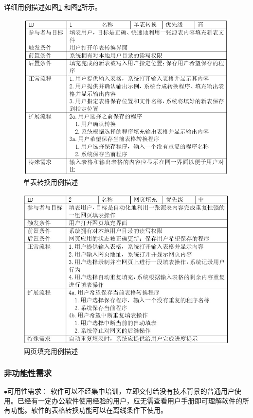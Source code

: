 \documentclass[design, pageheader]{njubachelor}
\begin{document}
详细用例描述如图\ref{fig:use_case_1} 和图\ref{fig:use_case_2}所示。

\begin{figure}
    \includegraphics{figures/use_case1.jpg}
    \caption{单表转换用例描述}
    \label{fig:use_case_1}
\end{figure}

\begin{figure}
    \includegraphics{figures/use_case2.jpg}
    \caption{网页填充用例描述}
    \label{fig:use_case_2}
\end{figure}

\subsubsection{非功能性需求}
$\bullet$可用性需求：
软件可以不经集中培训，立即交付给没有技术背景的普通用户使用。已经有一定办公软件使用经验的用户，应无需查看用户手册即可理解软件的所有功能。软件的表格转换功能可以在离线条件下使用。
\end{document}
